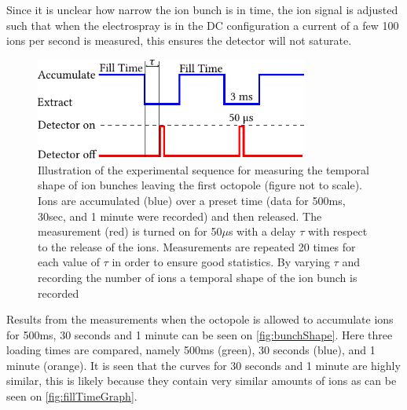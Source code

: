 Since it is unclear how narrow the ion bunch is in time, the ion signal is adjusted such that when the electrospray is in the DC configuration a current of a few 100 ions per second is measured, this ensures the detector will not saturate.
\begin{figure}
    \centering
    \includegraphics[width = 0.8\textwidth]{main/ShapePulse.pdf}
    \caption{Illustration of the experimental sequence for measuring the temporal shape of ion bunches leaving the first octopole (figure not to scale). Ions are accumulated (blue) over a preset time (data for 500ms, 30sec, and 1 minute were recorded) and then released. The measurement (red) is turned on for 50$\mu$s with a delay $\tau$ with respect to the release of the ions.
    Measurements are repeated 20 times for each value of $\tau$ in order to ensure good statistics. By varying $\tau$ and recording the number of ions a temporal shape of the ion bunch is recorded}
    \label{fig:sequenceShape}
\end{figure}

Results from the measurements when the octopole is allowed to accumulate ions for 500ms, 30 seconds and 1 minute can be seen on 
\cref{fig:bunchShape}. Here three loading times are compared, namely 500ms (green), 30 seconds (blue), and 1 minute (orange).
It is seen that the curves for 30 seconds and 1 minute are highly similar, this is likely because they contain very similar amounts of ions as can be seen on \cref{fig:fillTimeGraph}.

